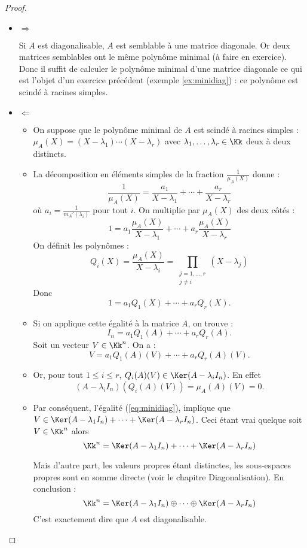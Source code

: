 \documentclass[12pt, class=report,crop=false]{standalone}
\begin{document}
\begin{proof}~

\begin{itemize}
\item $\Longrightarrow$ 

Si $A$ est diagonalisable, $A$ est semblable à une matrice diagonale. Or deux matrices semblables ont le même polynôme minimal (à faire en exercice). Donc il suffit de calculer le polynôme minimal d'une matrice diagonale ce qui est l'objet d'un exercice précédent 
(exemple \ref{ex:minidiag}) : ce polynôme est scindé à racines simples.

\item $\Longleftarrow$

\begin{itemize}
    \item On suppose que le polynôme minimal de $A$ est scindé à racines simples :
   $\mu_A(X) = (X-\lambda_1)\cdots(X-\lambda_r)$ avec $\lambda_1,\ldots,\lambda_r\in \Kk$ deux à deux distincts.
   
    \item La décomposition en éléments simples de la fraction $\frac{1}{\mu_A(X)}$ donne :
\[\frac{1}{\mu_A(X)} = \frac{a_1}{X-\lambda_1} + \cdots +\frac{a_r}{X-\lambda_r}\]
où $a_i = \frac{1}{m_A'(\lambda_i)}$ pour tout $i$.
On multiplie par $\mu_A(X)$ des deux côtés :
\[1 = a_1\frac{\mu_A(X)}{X-\lambda_1} + \cdots + a_r\frac{\mu_A(X)}{X-\lambda_r}\]
On définit les polynômes :
\[Q_i(X) = \frac{\mu_A(X)}{X-\lambda_i} = \prod_{\substack{j=1,\ldots,r\\ j\neq i}}(X-\lambda_j) \]
Donc \[1  = a_1 Q_1(X) + \cdots + a_r Q_r(X).\]

    \item Si on applique cette égalité à la matrice $A$, on trouve :
\[I_n = a_1Q_1(A) +  \cdots +a_rQ_r(A).\]
Soit un vecteur $V \in \Kk^n$. On a :
\begin{equation}
\label{eq:minidiag}
V = a_1Q_1(A)(V) +\cdots+a_rQ_r(A)(V).
\end{equation}

    \item Or, pour tout $1 \le i \le r$, $Q_i(A)(V) \in \Ker (A -\lambda_iI_n)$.
    En effet 
\[(A-\lambda_iI_n)(Q_i(A)(V)) = \mu_A(A)(V) = 0 .\]
    
    \item Par conséquent, l'égalité (\ref{eq:minidiag}), implique que
    $V \in \Ker (A -\lambda_1I_n) + \cdots + \Ker (A -\lambda_rI_n)$.
    Ceci étant vrai quelque soit $V \in \Kk^n$ alors 
    $$\Kk^n = \Ker (A -\lambda_1I_n) + \cdots + \Ker (A -\lambda_rI_n)$$
    
    Mais d'autre part, les valeurs propres étant distinctes, les sous-espaces propres sont en somme directe (voir le chapitre \og{}Diagonalisation\fg{}).
    En conclusion :    
    \[\Kk^n = \Ker (A-\lambda_1I_n)\oplus \cdots \oplus \Ker (A-\lambda_rI_n)\]
C'est exactement dire que $A$ est diagonalisable.
  \end{itemize}
\end{itemize}


\end{proof}
\end{document}
